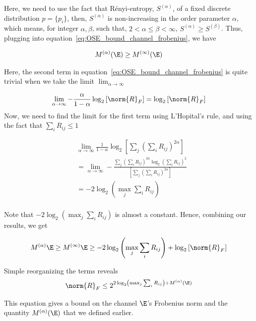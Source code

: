 Here, we need to use the fact that Rényi-entropy, $S^{(\alpha)}$, of a fixed discrete distribution $p=\{p_i\}$, then, $S^{(\alpha)}$ is non-increasing in the order parameter $\alpha$, which means, for integer $\alpha, \beta$, such that, $2<\alpha\le\beta<\infty$, $S^{(\alpha)}\ge S^{(\beta)}$. Thus, plugging into equation~\ref{eq:OSE_bound_channel_frobenius}, we have

\begin{equation}
\begin{split}
    &M^{(\alpha)}(\E)\ge M^{(\infty)}(\E)\\
\end{split}
\end{equation}

Here, the second term in equation~\ref{eq:OSE_bound_channel_frobenius} is quite trivial when we take the limit $\lim_{\alpha\rightarrow \infty}$

\begin{equation}
    \lim_{\alpha\rightarrow \infty}-\frac{\alpha}{1-\alpha}\log_2\left[ \norm{R}_F\right]=\log_2\left[ \norm{R}_F\right]
\end{equation}
Now, we need to find the limit for the first term using L'Hopital's rule, and using the fact that $\sum_iR_{ij}\le1$

\begin{equation}
\begin{split}
    &\lim_{\alpha\rightarrow \infty}\frac{1}{1-\alpha} \log_2\left[ \sum_j\left(\sum_i{R_{ij}}\right)^{2\alpha}\right]\\
    &=\lim_{\alpha\rightarrow \infty}-\frac{\sum_j\left(\sum_i R_{ij}\right)^{2\alpha}\log_2\left(\sum_iR_{ij}\right)^2}{\left[ \sum_j\left(\sum_i{R_{ij}}\right)^{2\alpha}\right]}\\
    & = -2\log_2\left(\max_j\sum_iR_{ij}\right)\\
\end{split}
\end{equation}

Note that $-2\log_2\left(\max_j\sum_iR_{ij}\right)$ is almost a constant. Hence, combining our results, we get

\begin{equation}
    M^{(\alpha)}{\E}\ge M^{(\infty)}{\E}\ge -2\log_2\left(\max_j\sum_iR_{ij}\right) + \log_2\left[ \norm{R}_F\right]
\end{equation}

Simple reorganizing the terms reveals
\begin{equation}
 \norm{R}_F \le 2^{2\log_2\left(\max_j\sum_iR_{ij}\right)+M^{(\alpha)}(\E)}
\end{equation}

This equation gives a bound on the channel $\E$'s Frobenius norm and the quantity $M^{(\alpha)}(\E)$ that we defined earlier.